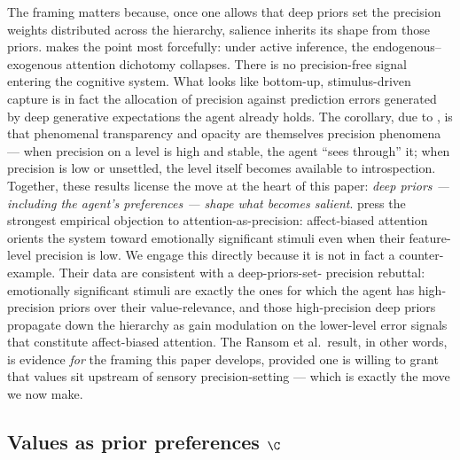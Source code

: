 The framing matters because, once one allows that deep priors set the precision
weights distributed across the hierarchy, salience inherits its shape from
those priors. \citet{parviziWayne2024PreferencesAttention} makes the point most
forcefully: under active inference, the endogenous--exogenous attention
dichotomy collapses. There is no precision-free signal entering the cognitive
system. What looks like bottom-up, stimulus-driven capture is in fact the
allocation of precision against prediction errors generated by deep generative
expectations the agent already holds. The corollary, due to
\citet{limanowskiFriston2018Dark}, is that phenomenal transparency and opacity
are themselves precision phenomena --- when precision on a level is high and
stable, the agent ``sees through'' it; when precision is low or unsettled, the
level itself becomes available to introspection. Together, these results
license the move at the heart of this paper: \emph{deep priors --- including
the agent's preferences --- shape what becomes salient}. \citet{ransom2020Cognition}
press the strongest empirical objection to attention-as-precision: affect-biased
attention orients the system toward emotionally significant stimuli even when
their feature-level precision is low. We engage this directly because it is
not in fact a counter-example. Their data are consistent with a deep-priors-set-
precision rebuttal: emotionally significant stimuli are exactly the ones for
which the agent has high-precision priors over their value-relevance, and
those high-precision deep priors propagate down the hierarchy as gain
modulation on the lower-level error signals that constitute affect-biased
attention. The Ransom et al.\ result, in other words, is evidence \emph{for}
the framing this paper develops, provided one is willing to grant that values
sit upstream of sensory precision-setting --- which is exactly the move we now
make.

\subsection{Values as prior preferences $\C$}
\label{sec:values-as-C}

